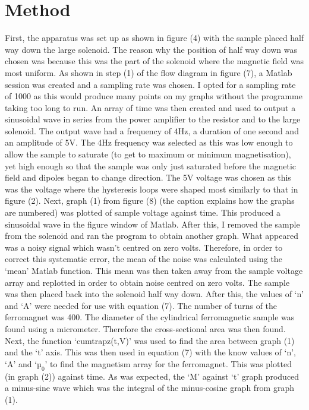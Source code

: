 \documentclass[a4paper]{article}\usepackage[english]{babel}
\begin{document}
\section{Method}
First, the apparatus was set up as shown in figure (4) with the sample placed half way down the large solenoid. The reason why the position of half way down was chosen was because this was the part of the solenoid where the magnetic field was most uniform.
As shown in step (1) of the flow diagram in figure (7), a Matlab session was created and a sampling rate was chosen. I opted for a sampling rate of 1000 as this would produce many points on my graphs without the programme taking too long to run.
An array of time was then created and used to output a sinusoidal wave in series from the power amplifier to the resistor and to the large solenoid. The output wave had a frequency of 4Hz, a duration of one second and an amplitude of 5V. The 4Hz frequency was selected as this was low enough to allow the sample to saturate (to get to maximum or minimum magnetisation), yet high enough so that the sample was only just saturated before the magnetic field and dipoles began to change direction. The 5V voltage was chosen as this was the voltage where the hysteresis loops were shaped most similarly to that in figure (2).
Next, graph (1) from figure (8) (the caption explains how the graphs are numbered) was plotted of sample voltage against time. This produced a sinusoidal wave in the figure window of Matlab. After this, I removed the sample from the solenoid and ran the program to obtain another graph. What appeared was a noisy signal which wasn’t centred on zero volts. Therefore, in order to correct this systematic error, the mean of the noise was calculated using the ‘mean’ Matlab function. This mean was then taken away from the sample voltage array and replotted in order to obtain noise centred on zero volts. The sample was then placed back into the solenoid half way down.
After this, the values of ‘n’ and ‘A’ were needed for use with equation (7). The number of turns of the ferromagnet was 400. The diameter of the cylindrical ferromagnetic sample was found using a micrometer. Therefore the cross-sectional area was then found.
Next, the function ‘cumtrapz(t,V)’ was used to find the area between graph (1) and the ‘t’ axis. This was then used in equation (7) with the know values of ‘n’, ‘A’ and ‘$µ_0$’ to find the magnetism array for the ferromagnet. This was plotted (in graph (2)) against time. As was expected, the ‘M’ against  ‘t’ graph produced a minus-sine wave which was the integral of the minus-cosine graph from graph (1). 
\end{document}
